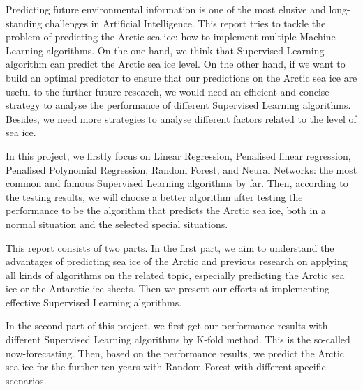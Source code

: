Predicting future environmental information is one of the most elusive and long-standing challenges in Artificial Intelligence. This report tries to tackle the problem of predicting the Arctic sea ice: how to implement multiple Machine Learning algorithms. On the one hand, we think that Supervised Learning algorithm can predict the Arctic sea ice level. On the other hand, if we want to build an optimal predictor to ensure that our predictions on the Arctic sea ice are useful to the further future research, we would need an efficient and concise strategy to analyse the performance of different Supervised Learning algorithms. Besides, we need more strategies to analyse different factors related to the level of sea ice.

In this project, we firstly focus on Linear Regression, Penalised linear regression, Penalised Polynomial Regression, Random Forest, and Neural Networks: the most common and famous Supervised Learning algorithms by far. Then, according to the testing results, we will choose a better algorithm after testing the performance to be the algorithm that predicts the Arctic sea ice, both in a normal situation and the selected special situations.

This report consists of two parts. In the first part, we aim to understand the advantages of predicting sea ice of the Arctic and previous research on applying all kinds of algorithms on the related topic, especially predicting the Arctic sea ice or the Antarctic ice sheets. Then we present our efforts at implementing effective Supervised Learning algorithms. 

In the second part of this project, we first get our performance results with different Supervised Learning algorithms by K-fold method. This is the so-called now-forecasting. Then, based on the performance results, we predict the Arctic sea ice for the further ten years with Random Forest with different specific scenarios.